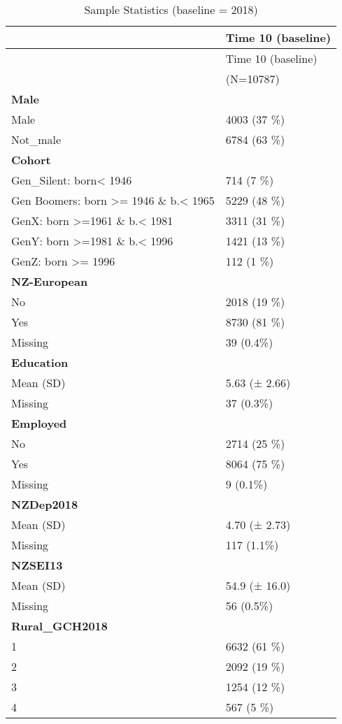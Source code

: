 \documentclass[
  singlecolumn]{report}
\begin{document}
\hypertarget{tbl-sample}{}
\begin{longtable}[]{@{}ll@{}}
\caption{\label{tbl-sample}Sample Statistics (baseline =
2018)}\tabularnewline
\toprule\noalign{}
& Time 10 (baseline) \\
\midrule\noalign{}
\endfirsthead
\toprule\noalign{}
& Time 10 (baseline) \\
\midrule\noalign{}
\endhead
\bottomrule\noalign{}
\endlastfoot
& (N=10787) \\
\textbf{Male} & \\
Male & 4003 (37 \%) \\
Not\_male & 6784 (63 \%) \\
\textbf{Cohort} & \\
Gen\_Silent: born\textless{} 1946 & 714 (7 \%) \\
Gen Boomers: born \textgreater= 1946 \& b.\textless{} 1965 & 5229 (48
\%) \\
GenX: born \textgreater=1961 \& b.\textless{} 1981 & 3311 (31 \%) \\
GenY: born \textgreater=1981 \& b.\textless{} 1996 & 1421 (13 \%) \\
GenZ: born \textgreater= 1996 & 112 (1 \%) \\
\textbf{NZ-European} & \\
No & 2018 (19 \%) \\
Yes & 8730 (81 \%) \\
Missing & 39 (0.4\%) \\
\textbf{Education} & \\
Mean (SD) & 5.63 (± 2.66) \\
Missing & 37 (0.3\%) \\
\textbf{Employed} & \\
No & 2714 (25 \%) \\
Yes & 8064 (75 \%) \\
Missing & 9 (0.1\%) \\
\textbf{NZDep2018} & \\
Mean (SD) & 4.70 (± 2.73) \\
Missing & 117 (1.1\%) \\
\textbf{NZSEI13} & \\
Mean (SD) & 54.9 (± 16.0) \\
Missing & 56 (0.5\%) \\
\textbf{Rural\_GCH2018} & \\
1 & 6632 (61 \%) \\
2 & 2092 (19 \%) \\
3 & 1254 (12 \%) \\
4 & 567 (5 \%) \\

\end{longtable}
\end{document}
